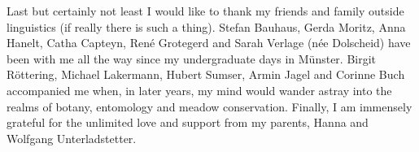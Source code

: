 \begin{refsection}
Last but certainly not least I would like to thank my friends and family outside linguistics (if really there is such a thing). Stefan Bauhaus, Gerda Moritz, Anna Hanelt, Catha Capteyn, René Grotegerd and Sarah Verlage (née Dolscheid) have been with me all the way since my undergraduate days in Münster. Birgit Röttering, Michael Lakermann, Hubert Sumser, Armin Jagel and Corinne Buch accompanied me when, in later years, my mind would wander astray into the realms of botany, entomology and meadow conservation. Finally, I am immensely grateful for the unlimited love and support from my parents, Hanna and Wolfgang Unterladstetter.

\printbibliography[heading=subbibliography]
\end{refsection}